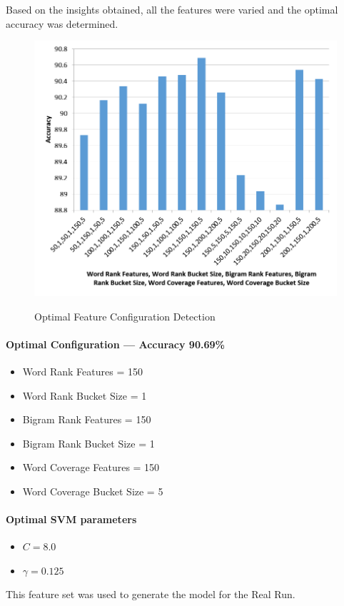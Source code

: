 \documentclass[a4paper,10pt]{report}
\begin{document}
Based on the insights obtained, all the features were varied and the optimal accuracy was determined.

\begin{figure}[h!]
\centering
\includegraphics[width=\textwidth]{./diagrams/optimal}\\
\caption{Optimal Feature Configuration Detection}
\end{figure}

\paragraph{Optimal Configuration --- Accuracy 90.69\%}
\begin{itemize}
\item Word Rank Features = 150
\item Word Rank Bucket Size = 1
\item Bigram Rank Features = 150
\item Bigram Rank Bucket Size = 1
\item Word Coverage Features = 150
\item Word Coverage Bucket Size = 5
\end{itemize}

\paragraph{Optimal SVM parameters}
\begin{itemize}
\item $C = 8.0$
\item $\gamma = 0.125$
\end{itemize}
This feature set was used to generate the model for the Real Run.
\clearpage
\end{document}
